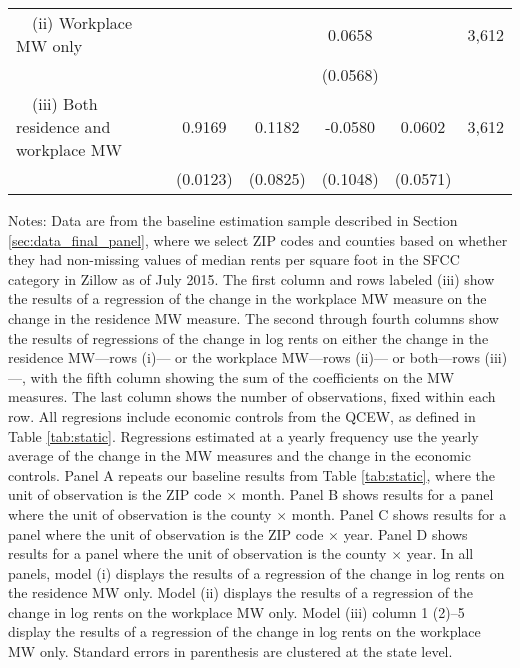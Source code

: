 \begin{landscape}
\begin{table}[ht!]
{\begin{tabular}{@{}lccccc@{}}
        $\quad$(ii) Workplace MW only                        &       &       &  0.0658  &       & 3,612 \\
                                                             &       &       & (0.0568) &       &      \\
        $\quad$(iii) Both residence and workplace MW         &  0.9169  &  0.1182  &  -0.0580  &  0.0602  & 3,612 \\
                                                             & (0.0123) & (0.0825) & (0.1048) & (0.0571) &      \\ \bottomrule
    \end{tabular}
    }
    \begin{minipage}{.95\linewidth} \scriptsize
        \vspace{2mm}
        Notes:
        Data are from the baseline estimation sample described in Section 
        \ref{sec:data_final_panel}, where we select ZIP codes and counties based 
        on whether they had non-missing values of median rents per square foot 
        in the SFCC category in Zillow as of July 2015.
        The first column and rows labeled (iii) show the results of a regression 
        of the change in the workplace MW measure on the change in the 
        residence MW measure.
        The second through fourth columns show the results of regressions of the 
        change in log rents on either the change in the residence MW---rows (i)---
        or the workplace MW---rows (ii)--- 
        or both---rows (iii)---, with the fifth column showing the sum of the 
        coefficients on the MW measures.
        The last column shows the number of observations, fixed within each row.
        All regresions include economic controls from the QCEW, as defined in
        Table \ref{tab:static}.
        Regressions estimated at a yearly frequency use the yearly average of
        the change in the MW measures and the change in the economic controls.
        Panel A repeats our baseline results from Table \ref{tab:static}, where 
        the unit of observation is the ZIP code $\times$ month.
        Panel B shows results for a panel where the unit of observation is the 
        county $\times$ month.
        Panel C shows results for a panel where the unit of observation is the 
        ZIP code $\times$ year.
        Panel D shows results for a panel where the unit of observation is the 
        county $\times$ year.
        In all panels,
        model (i) displays the results of a regression of the change in log 
        rents on the residence MW only.
        Model (ii) displays the results of a regression of the change in log 
        rents on the workplace MW only.
        Model (iii) column 1 (2)--5 display the results of a regression of the 
        change in log rents on the workplace MW only.
        Standard errors in parenthesis are clustered at the state level.        
    \end{minipage}
\end{table}
\end{landscape}
